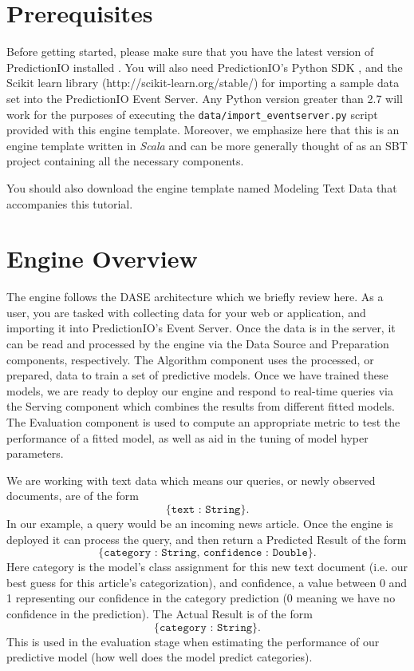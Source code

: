\documentclass[a4paper,12pt]{article}
\renewcommand{\it}[1]{\textit{#1}}
\renewcommand{\tt}[1]{\texttt{#1}}
\newcommand{\3}{\left}
\newcommand{\4}{\right}
\renewcommand{\-}[1]{{}^{-#1}}
\begin{document}
\section*{Prerequisites}

Before getting started, please make sure that you have the latest version of PredictionIO installed 
. You will also need PredictionIO's Python SDK 
, and the Scikit learn library (http://scikit-learn.org/stable/) for importing a sample data set into the PredictionIO Event Server. Any Python version greater than 2.7 will work for the purposes of executing the \tt{data/import\_eventserver.py} script provided with this engine template. Moreover, we emphasize here that this is an engine template written in \it{Scala} and can be more generally thought of as an SBT project containing all the necessary components.

You should also download the engine template named Modeling Text Data 
 that accompanies this tutorial.

\section*{Engine Overview}

The engine follows the DASE architecture which we briefly review here. As a user, you are tasked with collecting data for your web or application, and importing it into PredictionIO's Event Server. Once the data is in the server, it  can be read and processed by the engine via the Data Source and Preparation components, respectively. The Algorithm component uses the processed, or prepared, data to train a set of predictive models. Once we have trained these models, we are ready to deploy our engine and respond to real-time queries via the Serving component which combines the results from different fitted models. The Evaluation component is used to compute an appropriate metric to test the performance of a fitted model, as well as aid in the tuning of model hyper parameters. 

We are working with text data which means our queries, or newly observed documents, are of the form 
$$
\tt{\{text : String\}}.
$$
In our example, a query would be an incoming news article. Once the engine is deployed it can process the query, and then return a Predicted Result of the form 
$$
\tt{\{category : String, confidence : Double\}}.
$$
Here category is the model's class assignment for this new text document (i.e. our best guess for this article's categorization), and confidence, a value between 0 and 1 representing our confidence in the category prediction (0 meaning we have no confidence in the prediction). The Actual Result is of the form 
$$
\tt{\{category : String\}}.
$$
This is used in the evaluation stage when estimating the performance of our predictive model (how well does the model predict categories). 
 
\end{document}
